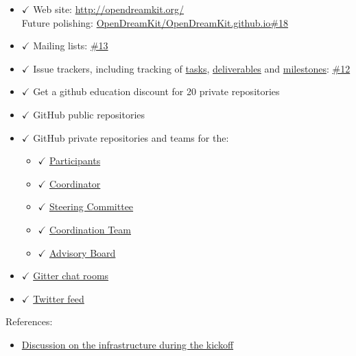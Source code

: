 \begin{itemize}
\tightlist
\item
  \(\checkmark\) Web site: \url{http://opendreamkit.org/}\\
  Future polishing:
  \href{https://github.com/OpenDreamKit/OpenDreamKit.github.io/issues/18}{OpenDreamKit/OpenDreamKit.github.io\#18}
\item
  \(\checkmark\) Mailing lists:
  \href{https://github.com/OpenDreamKit/OpenDreamKit/issues/13}{\#13}
\item
  \(\checkmark\) Issue trackers, including tracking of
  \href{https://github.com/OpenDreamKit/OpenDreamKit/labels/task?page=3\&q=is\%3Aopen+label\%3Atask}{tasks},
  \href{https://github.com/OpenDreamKit/OpenDreamKit/labels/deliverable?page=4\&q=is\%3Aopen+label\%3Adeliverable}{deliverables}
  and
  \href{https://github.com/OpenDreamKit/OpenDreamKit/milestones}{milestones}:
  \href{https://github.com/OpenDreamKit/OpenDreamKit/issues/12}{\#12}
\item
  \(\checkmark\) Get a github education discount for 20 private
  repositories
\item
  \(\checkmark\) GitHub public repositories
\item
  \(\checkmark\) GitHub private repositories and teams for the:

  \begin{itemize}
  \tightlist
  \item
    \(\checkmark\)
    \href{https://github.com/orgs/OpenDreamKit/teams/participants}{Participants}
  \item
    \(\checkmark\)
    \href{https://github.com/orgs/OpenDreamKit/teams/coordinator}{Coordinator}
  \item
    \(\checkmark\)
    \href{https://github.com/orgs/OpenDreamKit/teams/steering-committee}{Steering
    Committee}
  \item
    \(\checkmark\)
    \href{https://github.com/orgs/OpenDreamKit/teams/coordination}{Coordination
    Team}
  \item
    \(\checkmark\)
    \href{https://github.com/orgs/OpenDreamKit/teams/advisory}{Advisory
    Board}
  \end{itemize}
\item
  \(\checkmark\) \href{https://gitter.im/OpenDreamKit}{Gitter chat
  rooms}
\item
  \(\checkmark\) \href{https://twitter.com/opendreamkit}{Twitter feed}
\end{itemize}

References:

\begin{itemize}
\tightlist
\item
  \href{http://opendreamkit.org/meetings/2015-09-02-Kickoff/infrastructure/}{Discussion
  on the infrastructure during the kickoff}
\end{itemize}
